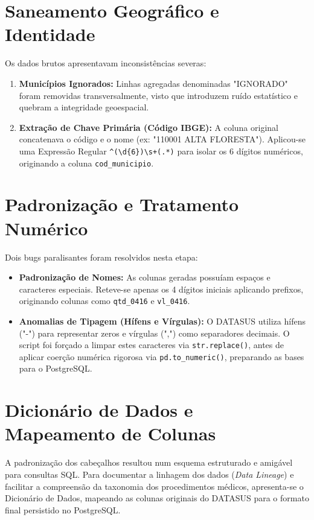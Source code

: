 \documentclass[12pt,a4paper]{report}
\begin{document}
\section{Saneamento Geográfico e Identidade}
Os dados brutos apresentavam inconsistências severas:
\begin{enumerate}
\item \textbf{Municípios Ignorados:} Linhas agregadas denominadas "IGNORADO" foram removidas transversalmente, visto que introduzem ruído estatístico e quebram a integridade geoespacial.
\item \textbf{Extração de Chave Primária (Código IBGE):} A coluna original concatenava o código e o nome (ex: "110001 ALTA FLORESTA"). Aplicou-se uma Expressão Regular \texttt{\textasciicircum(\textbackslash d\{6\})\textbackslash s+(.*)} para isolar os 6 dígitos numéricos, originando a coluna \texttt{cod\_municipio}.
\end{enumerate}

\section{Padronização e Tratamento Numérico}
Dois bugs paralisantes foram resolvidos nesta etapa:
\begin{itemize}
\item \textbf{Padronização de Nomes:} As colunas geradas possuíam espaços e caracteres especiais. Reteve-se apenas os 4 dígitos iniciais aplicando prefixos, originando colunas como \texttt{qtd\_0416} e \texttt{vl\_0416}.
\item \textbf{Anomalias de Tipagem (Hífens e Vírgulas):} O DATASUS utiliza hífens ("-") para representar zeros e vírgulas (",") como separadores decimais. O script foi forçado a limpar estes caracteres via \texttt{str.replace()}, antes de aplicar coerção numérica rigorosa via \texttt{pd.to\_numeric()}, preparando as bases para o PostgreSQL.
\end{itemize}

\section{Dicionário de Dados e Mapeamento de Colunas}
A padronização dos cabeçalhos resultou num esquema estruturado e amigável para consultas SQL. Para documentar a linhagem dos dados (\textit{Data Lineage}) e facilitar a compreensão da taxonomia dos procedimentos médicos, apresenta-se o Dicionário de Dados, mapeando as colunas originais do DATASUS para o formato final persistido no PostgreSQL.
\end{document}
